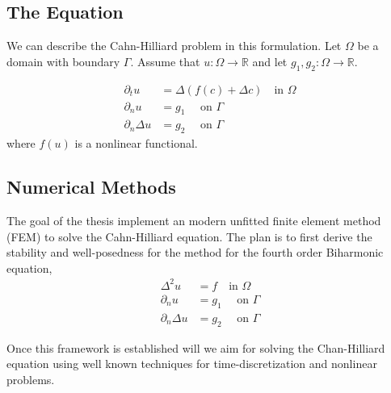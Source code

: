 \subsection{The Equation}%
\label{sub:the_equations}

We can describe the Cahn-Hilliard problem in this formulation. Let $\Omega  $ be a domain with boundary $\Gamma $. Assume that $u: \Omega  \to \mathbb{R}  $ and let $g_{1},g_{2}:\Omega  \to \mathbb{R} $.


\[
    \begin{split}
\partial _{t} u &= \Delta ( f(c) +  \Delta c)     \quad  \text{in } \Omega \\
\partial _{n} u & = g_{1} \quad \text{ on } \Gamma  \\
\partial _{n} \Delta u  & = g_{2} \quad \text{ on } \Gamma
    \end{split}
\]
where $f( u) $ is a nonlinear functional.

\subsection{Numerical Methods}%
\label{sub:numerical_methods}

The goal of the thesis implement an modern unfitted finite element method (FEM) to solve the Cahn-Hilliard equation. The plan is to first derive the stability and well-posedness for the method for the fourth order Biharmonic equation,
\[
    \begin{split}
\Delta ^2 u & = f \quad  \text{in } \Omega \\
\partial _{n} u & = g_{1} \quad \text{ on } \Gamma  \\
\partial _{n} \Delta u  & = g_{2} \quad \text{ on } \Gamma
    \end{split}
\]

Once this framework is established will we aim for solving the Chan-Hilliard equation using well known techniques for time-discretization and nonlinear problems.







